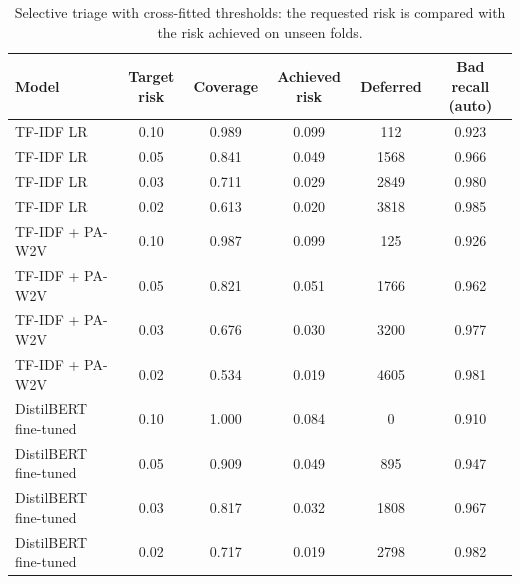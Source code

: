 \begin{table}[H]
\centering
\footnotesize
\caption{Selective triage with cross-fitted thresholds: the requested risk is compared with the risk achieved on unseen folds.}
\label{tab:selective}
\begin{tabular}{lccccc}
\toprule
Model & Target risk & Coverage & Achieved risk & Deferred & Bad recall (auto) \\
\midrule
TF-IDF LR & 0.10 & 0.989 & 0.099 & 112 & 0.923 \\
TF-IDF LR & 0.05 & 0.841 & 0.049 & 1568 & 0.966 \\
TF-IDF LR & 0.03 & 0.711 & 0.029 & 2849 & 0.980 \\
TF-IDF LR & 0.02 & 0.613 & 0.020 & 3818 & 0.985 \\
TF-IDF + PA-W2V & 0.10 & 0.987 & 0.099 & 125 & 0.926 \\
TF-IDF + PA-W2V & 0.05 & 0.821 & 0.051 & 1766 & 0.962 \\
TF-IDF + PA-W2V & 0.03 & 0.676 & 0.030 & 3200 & 0.977 \\
TF-IDF + PA-W2V & 0.02 & 0.534 & 0.019 & 4605 & 0.981 \\
DistilBERT fine-tuned & 0.10 & 1.000 & 0.084 & 0 & 0.910 \\
DistilBERT fine-tuned & 0.05 & 0.909 & 0.049 & 895 & 0.947 \\
DistilBERT fine-tuned & 0.03 & 0.817 & 0.032 & 1808 & 0.967 \\
DistilBERT fine-tuned & 0.02 & 0.717 & 0.019 & 2798 & 0.982 \\
\bottomrule
\end{tabular}
\end{table}